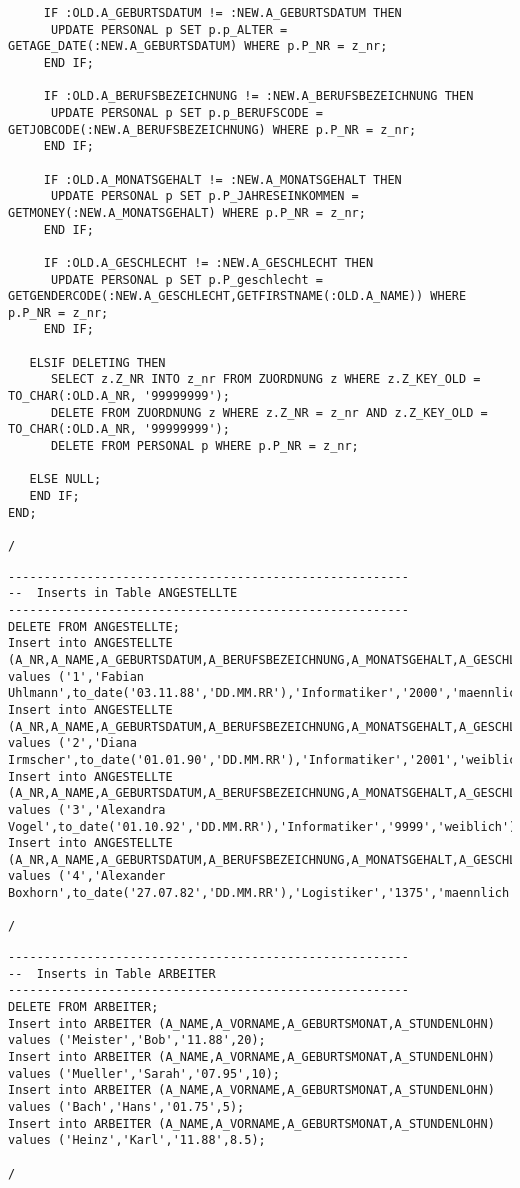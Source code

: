 \documentclass{scrartcl}
\begin{document}
\begin{lstlisting}
     IF :OLD.A_GEBURTSDATUM != :NEW.A_GEBURTSDATUM THEN
      UPDATE PERSONAL p SET p.p_ALTER = GETAGE_DATE(:NEW.A_GEBURTSDATUM) WHERE p.P_NR = z_nr;
     END IF;
    
     IF :OLD.A_BERUFSBEZEICHNUNG != :NEW.A_BERUFSBEZEICHNUNG THEN
      UPDATE PERSONAL p SET p.p_BERUFSCODE = GETJOBCODE(:NEW.A_BERUFSBEZEICHNUNG) WHERE p.P_NR = z_nr;
     END IF;

     IF :OLD.A_MONATSGEHALT != :NEW.A_MONATSGEHALT THEN
      UPDATE PERSONAL p SET p.P_JAHRESEINKOMMEN = GETMONEY(:NEW.A_MONATSGEHALT) WHERE p.P_NR = z_nr;
     END IF;

     IF :OLD.A_GESCHLECHT != :NEW.A_GESCHLECHT THEN
      UPDATE PERSONAL p SET p.P_geschlecht = GETGENDERCODE(:NEW.A_GESCHLECHT,GETFIRSTNAME(:OLD.A_NAME)) WHERE p.P_NR = z_nr;
     END IF;
    
   ELSIF DELETING THEN
      SELECT z.Z_NR INTO z_nr FROM ZUORDNUNG z WHERE z.Z_KEY_OLD = TO_CHAR(:OLD.A_NR, '99999999');
      DELETE FROM ZUORDNUNG z WHERE z.Z_NR = z_nr AND z.Z_KEY_OLD = TO_CHAR(:OLD.A_NR, '99999999');
      DELETE FROM PERSONAL p WHERE p.P_NR = z_nr;
    
   ELSE NULL;
   END IF;
END;

/
\end{lstlisting}

\begin{lstlisting}
--------------------------------------------------------
--  Inserts in Table ANGESTELLTE
--------------------------------------------------------
DELETE FROM ANGESTELLTE;
Insert into ANGESTELLTE (A_NR,A_NAME,A_GEBURTSDATUM,A_BERUFSBEZEICHNUNG,A_MONATSGEHALT,A_GESCHLECHT) values ('1','Fabian Uhlmann',to_date('03.11.88','DD.MM.RR'),'Informatiker','2000','maennlich');
Insert into ANGESTELLTE (A_NR,A_NAME,A_GEBURTSDATUM,A_BERUFSBEZEICHNUNG,A_MONATSGEHALT,A_GESCHLECHT) values ('2','Diana Irmscher',to_date('01.01.90','DD.MM.RR'),'Informatiker','2001','weiblich');
Insert into ANGESTELLTE (A_NR,A_NAME,A_GEBURTSDATUM,A_BERUFSBEZEICHNUNG,A_MONATSGEHALT,A_GESCHLECHT) values ('3','Alexandra Vogel',to_date('01.10.92','DD.MM.RR'),'Informatiker','9999','weiblich');
Insert into ANGESTELLTE (A_NR,A_NAME,A_GEBURTSDATUM,A_BERUFSBEZEICHNUNG,A_MONATSGEHALT,A_GESCHLECHT) values ('4','Alexander Boxhorn',to_date('27.07.82','DD.MM.RR'),'Logistiker','1375','maennlich');

/
\end{lstlisting}

\begin{lstlisting}
--------------------------------------------------------
--  Inserts in Table ARBEITER
--------------------------------------------------------
DELETE FROM ARBEITER;
Insert into ARBEITER (A_NAME,A_VORNAME,A_GEBURTSMONAT,A_STUNDENLOHN) values ('Meister','Bob','11.88',20);
Insert into ARBEITER (A_NAME,A_VORNAME,A_GEBURTSMONAT,A_STUNDENLOHN) values ('Mueller','Sarah','07.95',10);
Insert into ARBEITER (A_NAME,A_VORNAME,A_GEBURTSMONAT,A_STUNDENLOHN) values ('Bach','Hans','01.75',5);
Insert into ARBEITER (A_NAME,A_VORNAME,A_GEBURTSMONAT,A_STUNDENLOHN) values ('Heinz','Karl','11.88',8.5);

/
\end{lstlisting}
\end{document}
